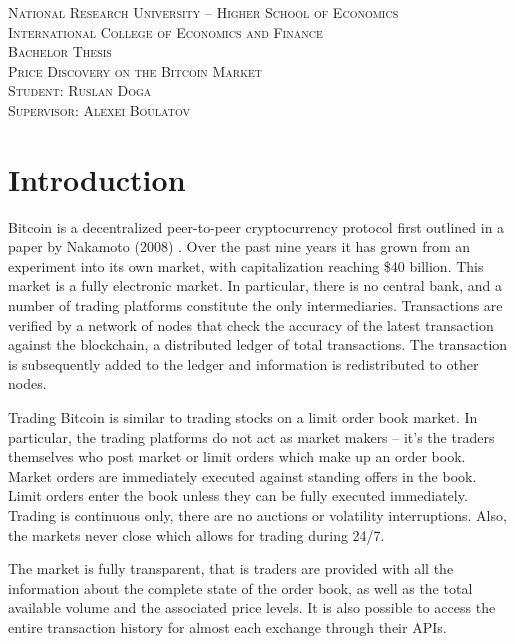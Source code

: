 \documentclass[a4paper,12pt]{article}
\begin{document}
  \begin{titlepage}
    \begin{center}
      \textsc{National Research University -- Higher School of Economics} \\[0.4cm]
      \textsc{International College of Economics and Finance}             \\[8.0cm]
      \textsc{Bachelor Thesis}                                            \\[0.4cm]
      \textsc{\large Price Discovery on the Bitcoin Market}               \\[12cm]
      \textsc{Student: Ruslan Doga}                                       \\[0.4cm]
      \textsc{Supervisor: Alexei Boulatov}
    \end{center}
  \end{titlepage}

  \tableofcontents
  \pagebreak


  \section{Introduction}
    Bitcoin is a decentralized peer-to-peer cryptocurrency protocol first outlined in a paper by Nakamoto (2008) \cite{nakamoto}. Over the past nine years it has grown from an experiment into its own market, with capitalization reaching \$40 billion. This market is a fully electronic market. In particular, there is no central bank, and a number of trading platforms constitute the only intermediaries. Transactions are verified by a network of nodes that check the accuracy of the latest transaction against the blockchain, a distributed ledger of total transactions. The transaction is subsequently added to the ledger and information is redistributed to other nodes.

    Trading Bitcoin is similar to trading stocks on a limit order book market. In particular, the trading platforms do not act as market makers -- it's the traders themselves who post market or limit orders which make up an order book. Market orders are immediately executed against standing offers in the book. Limit orders enter the book unless they can be fully executed immediately. Trading is continuous only, there are no auctions or volatility interruptions. Also, the markets never close which allows for trading during 24/7.

    The market is fully transparent, that is traders are provided with all the information about the complete state of the order book, as well as the total available volume and the associated price levels. It is also possible to access the entire transaction history for almost each exchange through their APIs.
\end{document}

